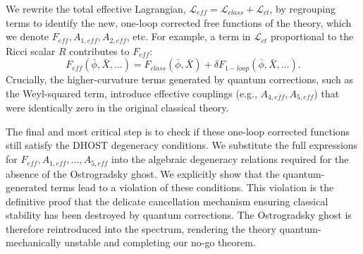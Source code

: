 \documentclass[twocolumn]{aastex631}
\begin{document}
We rewrite the total effective Lagrangian, $\mathcal{L}_{eff} = \mathcal{L}_{class} + \mathcal{L}_{ct}$, by regrouping terms to identify the new, one-loop corrected free functions of the theory, which we denote $F_{eff}, A_{1,eff}, A_{2,eff}$, etc. For example, a term in $\mathcal{L}_{ct}$ proportional to the Ricci scalar $R$ contributes to $F_{eff}$:
\begin{equation}F_{eff}(\bar{\phi}, \bar{X}, \dots) = F_{class}(\bar{\phi}, \bar{X}) + \delta F_{1-loop}(\bar{\phi}, \bar{X}, \dots).\end{equation}
Crucially, the higher-curvature terms generated by quantum corrections, such as the Weyl-squared term, introduce effective couplings (e.g., $A_{4,eff}, A_{5,eff}$) that were identically zero in the original classical theory. \citep{velascoaja2022quantumcorrectionseinsteinsequations,ma2024surprisingeffectivenessweylgravity,fröb2025weylanomalyinteractingquantum}

The final and most critical step is to check if these one-loop corrected functions still satisfy the DHOST degeneracy conditions. We substitute the full expressions for $F_{eff}, A_{1,eff}, \dots, A_{5,eff}$ into the algebraic degeneracy relations required for the absence of the Ostrogradsky ghost. We explicitly show that the quantum-generated terms lead to a violation of these conditions. This violation is the definitive proof that the delicate cancellation mechanism ensuring classical stability has been destroyed by quantum corrections. The Ostrogradsky ghost is therefore reintroduced into the spectrum, rendering the theory quantum-mechanically unstable and completing our no-go theorem.
\end{document}
